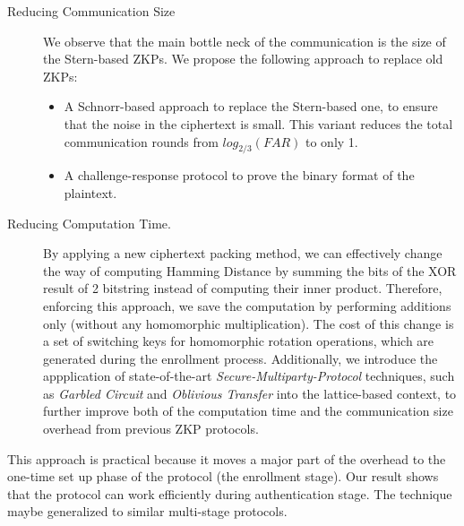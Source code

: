 \begin{description}
\item[Reducing Communication Size] We observe that the main bottle neck of the
  communication is the size of the Stern-based ZKPs. We propose the
  following approach to replace old ZKPs:
  \begin{itemize}
  \item A Schnorr-based approach to replace the Stern-based one, to ensure that the
    noise in the ciphertext is small. This variant reduces the total
    communication rounds from \(log_{2/3}(FAR)\) to only 1.
  \item A challenge-response protocol to prove the binary format of the
    plaintext.
  \end{itemize}
\item[Reducing Computation Time.] By applying a new ciphertext packing
  method, we can effectively change the way of computing Hamming Distance by
  summing the bits of the XOR result of 2 bitstring instead of computing their
  inner product. Therefore, enforcing this approach, we save the computation by performing
  additions only (without any homomorphic multiplication). The cost of this change
  is a set of switching keys for homomorphic rotation operations, which are
  generated during the enrollment process. Additionally, we introduce the
  appplication of state-of-the-art \textit{Secure-Multiparty-Protocol}
  techniques, such as \textit{Garbled Circuit} and \textit{Oblivious Transfer} into
  the lattice-based context, to further improve both of the computation time and
  the communication size overhead from previous ZKP protocols.
\end{description}
This approach is practical because it moves a major part of the overhead to the
one-time set up phase of the protocol (the enrollment stage). Our result shows
that the protocol can work efficiently during authentication stage. The
technique maybe generalized to similar multi-stage protocols.


